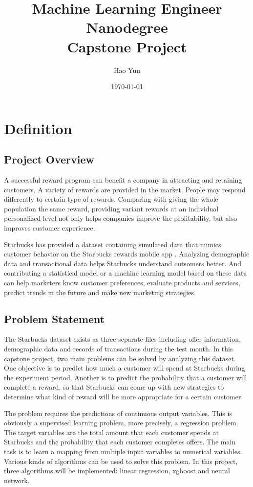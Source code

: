 \documentclass[a4paper,12pt]{article}
\title{Machine Learning Engineer Nanodegree \\ Capstone Project}
\author{Hao Yun}
\date{\today}
\begin{document}
\maketitle

\section{Definition}

\subsection*{Project Overview}

A successful reward program can benefit a company in attracting and retaining customers. A variety of rewards are provided in 
the market. People may respond differently to certain type of rewards. Comparing with giving the whole population the same 
reward, providing variant rewards at an individual personalized level not only helps companies improve the profitability, but 
also improves customer experience.

Starbucks has provided a dataset containing simulated data that mimics customer behavior on the Starbucks rewards mobile app 
\cite{StarbucksDataset}. Analyzing demographic data and transactional data helps Starbucks understand cutsomers better. And 
contributing a statistical model or a machine learning model based on these data can help marketers know customer preferences, 
evaluate products and services, predict trends in the future and make new marketing strategies.

\subsection*{Problem Statement}

The Starbucks dataset exists as three separate files including offer information, demographic data and records of transactions 
during the test month. In this capstone project, two main problems can be solved by analyzing this dataset. One objective is to 
predict how much a customer will spend at Starbucks during the experiment period. Another is to predict the probability that a 
customer will complete a reward, so that Starbucks can come up with new strategies to determine what kind of reward will be 
more appropriate for a certain customer.

The problem requires the predictions of continuous output variables. This is obviously a supervised learning problem, more 
precisely, a regression problem. The target variables are the total amount that each customer spends at Starbucks and the 
probability that each customer completes offers. The main task is to learn a mapping from multiple input variables to 
numerical variables. Various kinds of algorithms can be used to solve this problem. In this project, three algorithms will be 
implemented: linear regression, xgboost and neural network.
\end{document}
